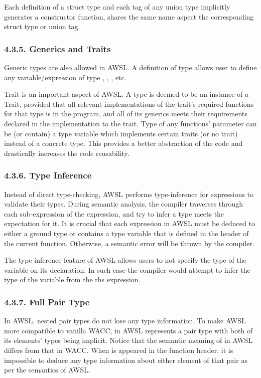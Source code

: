 \documentclass[10pt,a4paper]{report}
\begin{document}
  Each definition of a struct type and each tag of any union type implicitly
  generates a constructor function, shares the same name aspect the
  corresponding struct type or union tag.

  \subsubsection*{4.3.5. Generics and Traits}
  Generic types are also allowed in AWSL. A definition of type
   allows user to define any variable/expression of type
  , ,
  , etc.

  Trait is an important aspect of AWSL. A type is deemed to be an instance of a
  Trait, provided that all relevant implementations of the trait's required
  functions for that type is in the program, and all of its generics meets their
  requirements declared in the implementation to the trait. Type of any
  functions' parameter can be (or contain) a type variable which implements
  certain traits (or no trait) instead of a concrete type. This provides a
  better abstraction of the code and drastically increases the code reusability. 

  \subsubsection*{4.3.6. Type Inference}
  Instead of direct type-checking, AWSL performs type-inference for expressions
  to validate their types. During semantic analysis, the compiler traverses
  through each sub-expression of the expression, and try to infer a type meets
  the expectation for it. It is crucial that each expression in AWSL must be
  deduced to either a ground type or contains a type variable that is defined in
  the header of the current function. Otherwise, a semantic error will be thrown
  by the compiler.

  The type-inference feature of AWSL allows users to not specify the type of the
  variable on its declaration. In such case the compiler would attempt to infer
  the type of the variable from the rhs expression.

  \subsubsection*{4.3.7. Full Pair Type}
  In AWSL, nested pair types do not lose any type information. To make AWSL more
  compatible to vanilla WACC,  in AWSL represents a pair type with
  both of its elements' types being implicit. Notice that the semantic meaning of
   in AWSL differs from that in WACC. When  is
  appeared in the function header, it is impossible to deduce any type
  information about either element of that pair as per the semantics of AWSL.
\end{document}
